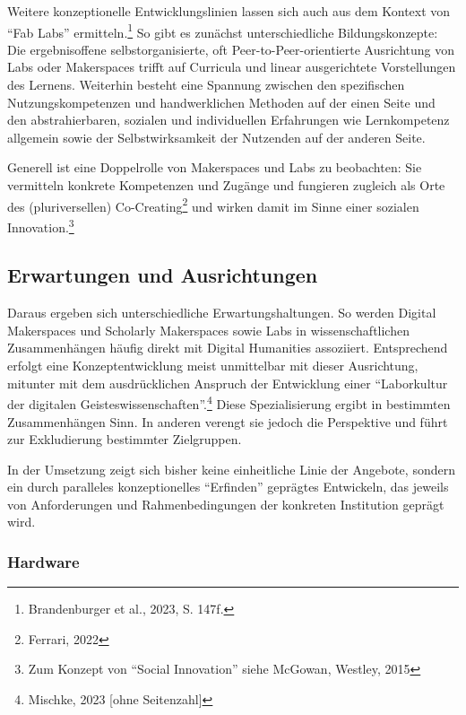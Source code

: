 \documentclass[a4paper,
fontsize=11pt,
oneside,
numbers=noperiodatend,
parskip=half-,
bibliography=totoc,
final
]{scrartcl}
\begin{document}
Weitere konzeptionelle Entwicklungslinien lassen sich auch aus dem
Kontext von \enquote{Fab Labs} ermitteln.\footnote{Brandenburger et al.,
  2023, S. 147f.} So gibt es zunächst unterschiedliche Bildungskonzepte:
Die ergebnisoffene selbstorganisierte, oft Peer-to-Peer-orientierte
Ausrichtung von Labs oder Makerspaces trifft auf Curricula und linear
ausgerichtete Vorstellungen des Lernens. Weiterhin besteht eine Spannung
zwischen den spezifischen Nutzungskompetenzen und handwerklichen
Methoden auf der einen Seite und den abstrahierbaren, sozialen und
individuellen Erfahrungen wie Lernkompetenz allgemein sowie der
Selbstwirksamkeit der Nutzenden auf der anderen Seite.

Generell ist eine Doppelrolle von Makerspaces und Labs zu beobachten:
Sie vermitteln konkrete Kompetenzen und Zugänge und fungieren zugleich
als Orte des (pluriversellen) Co-Creating\footnote{Ferrari, 2022} und
wirken damit im Sinne einer sozialen Innovation.\footnote{Zum Konzept
  von \enquote{Social Innovation} siehe McGowan, Westley, 2015}

\hypertarget{erwartungen-und-ausrichtungen}{%
\subsection{Erwartungen und
Ausrichtungen}\label{erwartungen-und-ausrichtungen}}

Daraus ergeben sich unterschiedliche Erwartungshaltungen. So werden
Digital Makerspaces und Scholarly Makerspaces sowie Labs in
wissenschaftlichen Zusammenhängen häufig direkt mit Digital Humanities
assoziiert. Entsprechend erfolgt eine Konzeptentwicklung meist
unmittelbar mit dieser Ausrichtung, mitunter mit dem ausdrücklichen
Anspruch der Entwicklung einer \enquote{Laborkultur der digitalen
Geisteswissenschaften}.\footnote{Mischke, 2023 {[}ohne Seitenzahl{]}}
Diese Spezialisierung ergibt in bestimmten Zusammenhängen Sinn. In
anderen verengt sie jedoch die Perspektive und führt zur Exkludierung
bestimmter Zielgruppen.

In der Umsetzung zeigt sich bisher keine einheitliche Linie der
Angebote, sondern ein durch paralleles konzeptionelles
\enquote{Erfinden} geprägtes Entwickeln, das jeweils von Anforderungen
und Rahmenbedingungen der konkreten Institution geprägt wird.

\hypertarget{hardware}{%
\subsubsection{Hardware}\label{hardware}}
\end{document}
